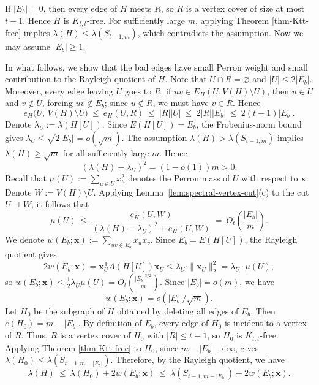 \documentclass[10pt,a4paper]{amsart}
\newcommand{\Ktt}{K_{t,t}}
\begin{document}
If $|E_b|=0$, then every edge of $H$ meets $R$, so \(R\) is a vertex cover of size at most \(t-1\). Hence $H$ is $\Ktt$-free.
For sufficiently large $m$, applying Theorem \ref{thm-Ktt-free} implies $\lambda(H)\le \lambda(S_{t-1,m})$, which contradicts the assumption. 
Now we may assume $|E_b|\ge 1$.

\smallskip
In what follows, we show that the bad edges have small Perron weight and small contribution to the Rayleigh quotient of $H$. 
Note that $U\cap R=\varnothing$ and $|U|\le 2|E_b|$. Moreover, every edge leaving $U$ goes to $R$:
if $uv\in E_H(U, V(H)\setminus U)$, then $u\in U$ and $v\notin U$, forcing $uv \notin E_b$; since \(u\notin R\), we must have $v\in R$.
Hence
\[
  e_H\!\bigl(U,\,V(H)\setminus U\bigr)\ \le \ e_H(U,R)\ \le\ |R||U|\ \le\ 2|R| |E_b|\ \le\ 2(t-1)|E_b|.
\]
Denote $\lambda_{U}:=\lambda(H[U])$. Since \(E(H[U])=E_b\), the Frobenius-norm bound gives $\lambda_{U} \le  \sqrt{2|E_b|} = o(\sqrt{m}).$
The assumption $\lambda(H)>\lambda(S_{t-1,m})$ implies $\lambda(H)\ge \sqrt{m}$ for all sufficiently large $m$. Hence
\[
        (\lambda(H)-\lambda_{U})^2=(1-o(1))m>0.
\]
Recall that $\mu(U):=\sum_{u\in U} x_u^2$ denotes the Perron mass of $U$ with respect to $\bm{x}$. 
Denote $W:=V(H)\setminus U$. 
Applying Lemma~\ref{lem:spectral-vertex-cut}\textup{(c)} to the cut $U\,\sqcup\,W$, it follows that  
\[
  \mu(U)
  \ \le\
  \frac{e_H(U,W)}{(\lambda(H)-\lambda_{U})^2+e_H(U,W)}
  \ =\ O_t\!\left(\frac{|E_b|}{m}\right).
\]
We denote $w(E_b; \bm{x}) := \sum_{uv\in E_b} x_ux_v$. 
Since $E_b=E(H[U])$, the Rayleigh quotient gives  
\[
  2w(E_b; \bm{x})
  =\bm{x}_{U}^{\mathsf T}A(H[U]) \bm{x}_U
  \le
  \lambda_U \cdot \| \bm{x}_U\|_2^2
  =
  \lambda_U\cdot \mu(U),
\]
so $w(E_b; \bm{x})
        \le
        \frac12\lambda_U \mu(U)
        =
        O_t\!\left(\frac{|E_b|^{3/2}}{m}\right).$
Since $|E_b|=o(m)$, we have
\begin{equation}
    \label{eq-bad-edge-small}
    w(E_b; \bm{x}) = o \left(|E_b| \big/\sqrt{m} \right). 
\end{equation} 
Let $H_0 $ be the subgraph of $H$ obtained by deleting all edges of $E_b$.
Then $e(H_0)=m- |E_b|$. By definition of $E_b$, every edge of $H_0$ is incident to a vertex of $R$.
Thus, $R$ is a vertex cover of $H_0$ with $|R|\le t-1$, so $H_0$ is $\Ktt$-free.
Applying Theorem \ref{thm-Ktt-free} to $H_0$, since \(m-|E_b|\to\infty\), gives
$\lambda(H_0) \le \lambda(S_{t-1,m- |E_b|}).$
Therefore, by the Rayleigh quotient, we have 
\begin{equation}\label{eq:sparseC-rowcover-lamH-upper}
  \lambda(H)\ \le \ \lambda(H_0)+2w(E_b; \bm{x}) \ \le\ \lambda(S_{t-1,m-|E_b|}) + 2w(E_b;\bm{x}).
\end{equation}
\end{document}
